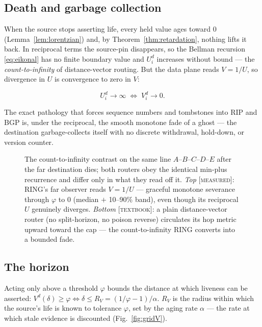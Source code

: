 \documentclass[11pt]{article}
\theoremstyle{plain}
\numberwithin{equation}{section}
\begin{document}
\subsection{Death and garbage collection}\label{sec:death}

When the source stops asserting life, every held value ages toward $0$ (Lemma~\ref{lem:lorentzian}) and, by Theorem~\ref{thm:retardation}, nothing lifts it back. In reciprocal terms the source-pin disappears, so the Bellman recursion \eqref{eq:eikonal} has no finite boundary value and $U^d_i$ increases without bound — the \emph{count-to-infinity} of distance-vector routing. But the data plane reads $V=1/U$, so divergence in $U$ is convergence to zero in $V$:

\[
U^d_i\to\infty \;\Longleftrightarrow\; V^d_i\to 0.
\]

The exact pathology that forces sequence numbers and tombstones into RIP and BGP is, under the reciprocal, the smooth monotone fade of a ghost — the destination garbage-collects itself with no discrete withdrawal, hold-down, or version counter.

\begin{figure}[tbp]
\centering

\caption{The count-to-infinity contrast on the same line $A$--$B$--$C$--$D$--$E$ after the far destination dies; both routers obey the identical min-plus recurrence and differ only in what they read off it. \emph{Top} \textsc{[measured]}: RING's far observer reads $V=1/U$ — graceful monotone severance through $\varphi$ to $0$ (median $+$ 10--90\% band), even though its reciprocal $U$ genuinely diverges. \emph{Bottom} \textsc{[textbook]}: a plain distance-vector router (no split-horizon, no poison reverse) circulates its hop metric upward toward the cap — the count-to-infinity RING converts into a bounded fade.}
\label{fig:dvring}
\end{figure}

\subsection{The horizon}\label{sec:horizon}

Acting only above a threshold $\varphi$ bounds the distance at which liveness can be asserted: $V^d(\delta)\ge\varphi\iff\delta\le R_V=(1/\varphi-1)/\alpha.$ $R_V$ is the radius within which the source's life is known to tolerance $\varphi$, set by the aging rate $\alpha$ — the rate at which stale evidence is discounted (Fig.~\ref{fig:gridV}).
\end{document}
